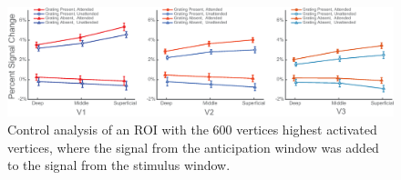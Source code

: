 \begin{figure}[!ht]
\centering
\includegraphics[width=1.0\textwidth, clip=true]{./Chapters/04_Attention/Images/SM_LayerResults_plusAttention}
\caption{Control analysis of an ROI with the 600 vertices highest activated vertices, where the signal from the anticipation window was added to the signal from the stimulus window.}
\label{fig:layerresultsplusattention}
\end{figure}